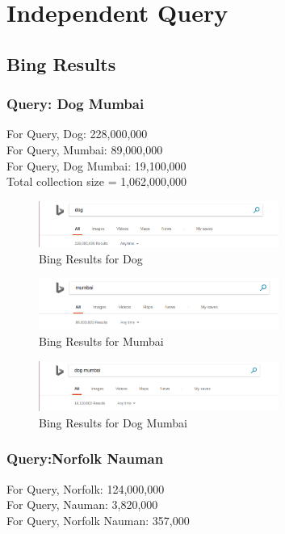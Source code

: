 \documentclass[12pt]{report}
\begin{document}
\section{Independent Query}
\subsection{Bing Results}
\subsubsection{Query: Dog Mumbai}
For Query, Dog: 228,000,000\\
For Query, Mumbai: 89,000,000\\
For Query, Dog Mumbai: 19,100,000\\

Total collection size = 1,062,000,000\\

\begin{figure}[ht] 
  \centering
  \includegraphics[width=0.7\textwidth]{Bing_Dog.png}
  \caption{Bing Results for Dog}
  \label{fig:1}
\end{figure}

\begin{figure}[ht] 
  \centering
  \includegraphics[width=0.7\textwidth]{Bing_Mumbai.png}
  \caption{Bing Results for Mumbai}
  \label{fig:2}
\end{figure}

\begin{figure}[ht] 
  \centering
  \includegraphics[width=0.7\textwidth]{Bing_dogmumbai.png}
  \caption{Bing Results for Dog Mumbai}
  \label{fig:3}
\end{figure}

\subsubsection{Query:Norfolk Nauman}
For Query, Norfolk: 124,000,000\\
For Query, Nauman: 3,820,000\\
For Query, Norfolk Nauman: 357,000\\
\end{document}
